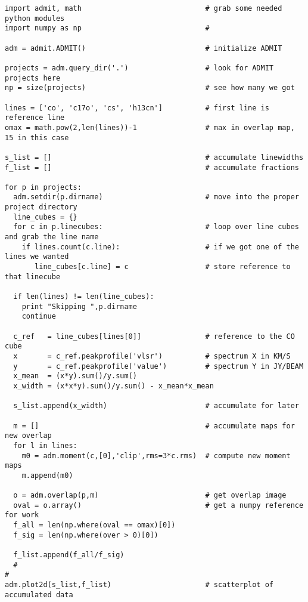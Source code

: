 \documentclass[preprint]{aastex} %
\begin{document}
\footnotesize
\begin{verbatim}  
import admit, math                             # grab some needed python modules
import numpy as np                             #

adm = admit.ADMIT()                            # initialize ADMIT

projects = adm.query_dir('.')                  # look for ADMIT projects here
np = size(projects)                            # see how many we got

lines = ['co', 'c17o', 'cs', 'h13cn']          # first line is reference line
omax = math.pow(2,len(lines))-1                # max in overlap map, 15 in this case

s_list = []                                    # accumulate linewidths
f_list = []                                    # accumulate fractions

for p in projects:
  adm.setdir(p.dirname)                        # move into the proper project directory
  line_cubes = {}
  for c in p.linecubes:                        # loop over line cubes and grab the line name
    if lines.count(c.line):                    # if we got one of the lines we wanted
       line_cubes[c.line] = c                  # store reference to that linecube

  if len(lines) != len(line_cubes):
    print "Skipping ",p.dirname
    continue

  c_ref   = line_cubes[lines[0]]               # reference to the CO cube
  x       = c_ref.peakprofile('vlsr')          # spectrum X in KM/S
  y       = c_ref.peakprofile('value')         # spectrum Y in JY/BEAM
  x_mean  = (x*y).sum()/y.sum()
  x_width = (x*x*y).sum()/y.sum() - x_mean*x_mean 

  s_list.append(x_width)                       # accumulate for later

  m = []                                       # accumulate maps for new overlap
  for l in lines:                           
    m0 = adm.moment(c,[0],'clip',rms=3*c.rms)  # compute new moment maps
    m.append(m0)

  o = adm.overlap(p,m)                         # get overlap image
  oval = o.array()                             # get a numpy reference for work
  f_all = len(np.where(oval == omax)[0])       
  f_sig = len(np.where(over > 0)[0])

  f_list.append(f_all/f_sig)
  #
#
adm.plot2d(s_list,f_list)                      # scatterplot of accumulated data 


\end{verbatim}
\normalsize
\newpage
\end{document}
